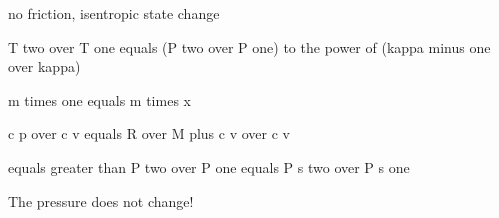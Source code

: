 no friction, isentropic state change

T two over T one equals (P two over P one) to the power of (kappa minus one over kappa)

m times one equals m times x

c p over c v equals R over M plus c v over c v

equals greater than P two over P one equals P s two over P s one

The pressure does not change!